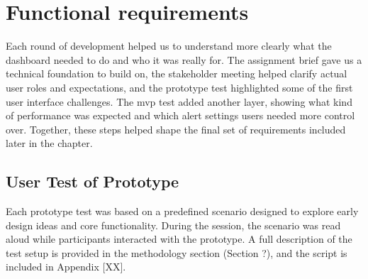 \section*{Functional requirements}
\begin{table}[H]
    \centering
    \renewcommand{\arraystretch}{1.3}
    \caption{Key changes in system requirements across development phases}
    \label{tab:req_evolution_table}
\end{table}

Each round of development helped us to understand more clearly what the dashboard needed to do and who it was really for. The assignment brief gave us a technical foundation to build on, the stakeholder meeting helped clarify actual user roles and expectations, and the prototype test highlighted some of the first user interface challenges. The \acrshort{mvp} test added another layer, showing what kind of performance was expected and which alert settings users needed more control over. Together, these steps helped shape the final set of requirements included later in the chapter.

\subsection{User Test of Prototype}
Each prototype test was based on a predefined scenario designed to explore early design ideas and core functionality. During the session, the scenario was read aloud while participants interacted with the prototype. A full description of the test setup is provided in the methodology section (Section ?), and the script is included in Appendix [XX].

